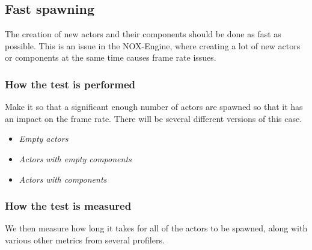 \subsection{Fast spawning}
The creation of new actors and their components should be done as fast as possible.
This is an issue in the NOX-Engine, where creating a lot of new actors or components at the same time causes frame rate issues.

\subsubsection*{How the test is performed}
Make it so that a significant enough number of actors are spawned so that it has an impact on the frame rate.
There will be several different versions of this case.

\begin{itemize}

    \item\noindent\textit{Empty actors}\\

    \item\noindent\textit{Actors with empty components}\\

    \item\noindent\textit{Actors with components}\\

\end{itemize}

\subsubsection*{How the test is measured}
We then measure how long it takes for all of the actors to be spawned, along with various other metrics from several profilers.
